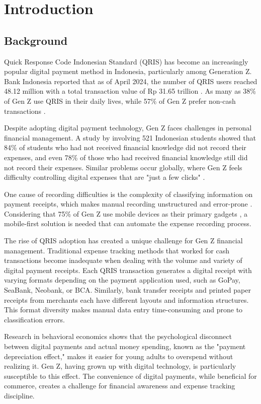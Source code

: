\section{Introduction}

\subsection{Background}
Quick Response Code Indonesian Standard (QRIS) has become an increasingly popular digital payment method in Indonesia, particularly among Generation Z. Bank Indonesia reported that as of April 2024, the number of QRIS users reached 48.12 million with a total transaction value of Rp 31.65 trillion \cite{CNNqris2024}. As many as 38\% of Gen Z use QRIS in their daily lives, while 57\% of Gen Z prefer non-cash transactions \cite{qris2023goodstats,jawapos2024qris}.

Despite adopting digital payment technology, Gen Z faces challenges in personal financial management. A study by \cite{johan2021effect} involving 521 Indonesian students showed that 84\% of students who had not received financial knowledge did not record their expenses, and even 78\% of those who had received financial knowledge still did not record their expenses. Similar problems occur globally, where Gen Z feels difficulty controlling digital expenses that are "just a few clicks" \cite{lewis2019follow}.

One cause of recording difficulties is the complexity of classifying information on payment receipts, which makes manual recording unstructured and error-prone \cite{kaye2014money}. Considering that 75\% of Gen Z use mobile devices as their primary gadgets \cite{Campfire2024GenZ}, a mobile-first solution is needed that can automate the expense recording process.

The rise of QRIS adoption has created a unique challenge for Gen Z financial management. Traditional expense tracking methods that worked for cash transactions become inadequate when dealing with the volume and variety of digital payment receipts. Each QRIS transaction generates a digital receipt with varying formats depending on the payment application used, such as GoPay, SeaBank, Neobank, or BCA. Similarly, bank transfer receipts and printed paper receipts from merchants each have different layouts and information structures. This format diversity makes manual data entry time-consuming and prone to classification errors.

Research in behavioral economics shows that the psychological disconnect between digital payments and actual money spending, known as the "payment depreciation effect," makes it easier for young adults to overspend without realizing it. Gen Z, having grown up with digital technology, is particularly susceptible to this effect. The convenience of digital payments, while beneficial for commerce, creates a challenge for financial awareness and expense tracking discipline.

